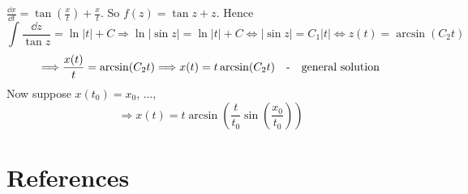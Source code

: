 \documentclass[twoside]{article}
\begin{document}
\begin{example}
    $\frac{\dd x}{\dd t} = \tan(\frac{x}{t}) + \frac{x}{t}$. So $ f(z) = \tan z + z $. Hence
    \begin{equation}
        \int \frac{\dd z}{\tan z} = \ln |t| + C \Longrightarrow \ln | \sin z| = \ln |t| + C \iff |\sin z | = C_1 |t| \iff z(t) = \arcsin (C_2 t)
    \end{equation}
    \begin{equation}
        \Longrightarrow \frac{x(t)}{t} = \arcsin (C_2 t) \Longrightarrow x(t) = t \arcsin (C_2 t) \quad \text{-\quad general solution}
    \end{equation}
    Now suppose $x(t_0) = x_0$, ..., 
    \begin{equation}
        \Longrightarrow x(t) = t \arcsin (\frac{t}{t_0}\sin(\frac{x_0}{t_0}))
    \end{equation}
\end{example}



































\clearpage

\section*{References}

\end{document}
